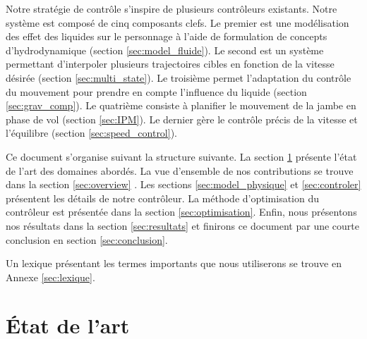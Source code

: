 \documentclass[runningheads,a4paper]{llncs}
\begin{document}
Notre stratégie de contrôle s'inspire de plusieurs contrôleurs existants. Notre système est composé de cinq composants clefs. Le premier est une modélisation des effet des liquides sur le personnage à l'aide de formulation de concepts d'hydrodynamique (section \ref{sec:model_fluide}).
Le second est un système permettant d'interpoler plusieurs trajectoires cibles en fonction de la vitesse désirée (section \ref{sec:multi_state}). Le troisième permet l'adaptation du contrôle du mouvement pour prendre en compte l'influence du liquide (section \ref{sec:grav_comp}).  Le quatrième consiste à planifier le mouvement de la jambe en phase de vol (section \ref{sec:IPM}). Le dernier gère le contrôle précis de la vitesse et l'équilibre (section \ref{sec:speed_control}).

Ce document s'organise suivant la structure suivante. La section \ref{sec:previous_works} présente l'état de l'art des domaines abordés. La vue d'ensemble de nos contributions se trouve dans la section \ref{sec:overview} . Les sections \ref{sec:model_physique} et \ref{sec:controler} présentent les détails de notre contrôleur. La méthode d'optimisation du contrôleur est présentée dans la section \ref{sec:optimisation}. Enfin, nous présentons nos résultats dans la section \ref{sec:resultats} et finirons ce document par une courte conclusion en section \ref{sec:conclusion}.

Un lexique présentant les termes importants que nous utiliserons se trouve en Annexe \ref{sec:lexique}.


%
\section{État de l'art}
\label{sec:previous_works}
%
\end{document}
